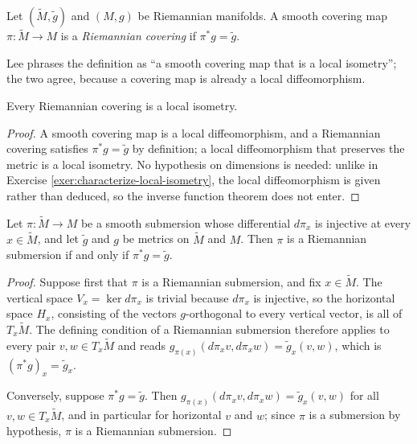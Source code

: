 \begin{definition}
\label{def:riemannian-covering}
\leanok
{}
Let $(\tilde{M}, \tilde{g})$ and $(M, g)$ be Riemannian manifolds. A smooth covering map $\pi: \tilde{M} \to M$ is a \emph{Riemannian covering} if $\pi^*g = \tilde{g}$.
\end{definition}

Lee phrases the definition as ``a smooth covering map that is a local isometry''; the two agree, because a covering map is already a local diffeomorphism.

\begin{lemma}
\label{lem:riemannian-covering-local-isometry}
\leanok
{}
Every Riemannian covering is a local isometry.
\end{lemma}

\begin{proof}
\leanok
{}
A smooth covering map is a local diffeomorphism, and a Riemannian covering satisfies $\pi^*g = \tilde{g}$ by definition; a local diffeomorphism that preserves the metric is a local isometry. No hypothesis on dimensions is needed: unlike in Exercise \ref{exer:characterize-local-isometry}, the local diffeomorphism is given rather than deduced, so the inverse function theorem does not enter.
\end{proof}

\begin{proposition}
\label{prop:equidimensional-riemannian-submersion-local-isometry}
\leanok
{}
Let $\pi: \tilde{M} \to M$ be a smooth submersion whose differential $d\pi_x$ is injective at every $x \in \tilde{M}$, and let $\tilde{g}$ and $g$ be metrics on $\tilde{M}$ and $M$. Then $\pi$ is a Riemannian submersion if and only if $\pi^*g = \tilde{g}$.
\end{proposition}

\begin{proof}
\leanok
Suppose first that $\pi$ is a Riemannian submersion, and fix $x \in \tilde{M}$. The vertical space $V_x = \ker d\pi_x$ is trivial because $d\pi_x$ is injective, so the horizontal space $H_x$, consisting of the vectors $g$-orthogonal to every vertical vector, is all of $T_x\tilde{M}$. The defining condition of a Riemannian submersion therefore applies to every pair $v, w \in T_x\tilde{M}$ and reads $g_{\pi(x)}(d\pi_x v, d\pi_x w) = \tilde{g}_x(v, w)$, which is $(\pi^*g)_x = \tilde{g}_x$.

Conversely, suppose $\pi^*g = \tilde{g}$. Then $g_{\pi(x)}(d\pi_x v, d\pi_x w) = \tilde{g}_x(v, w)$ for all $v, w \in T_x\tilde{M}$, and in particular for horizontal $v$ and $w$; since $\pi$ is a submersion by hypothesis, $\pi$ is a Riemannian submersion.
\end{proof}

